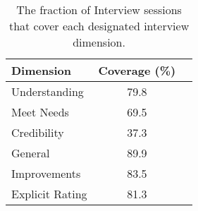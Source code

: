 \begin{table}
\small
\centering
\caption{The fraction of \method{} Interview sessions that cover each designated interview dimension.}\label{tab:dim_coverage}
\begin{tabular}{l|cc}
\hline
Dimension & Coverage (\%) \\
\hline
Understanding & 79.8 \\
Meet Needs & 69.5 \\
Credibility & 37.3 \\
General & 89.9 \\ \hline
Improvements & 83.5 \\ \hline
Explicit Rating & 81.3 \\
\hline
\end{tabular}
\end{table}